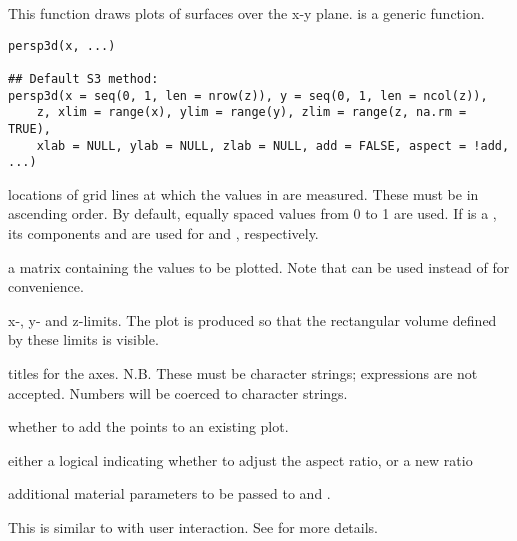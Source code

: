 \documentclass{article}
\begin{document}
\begin{Description}\relax
This function draws plots of surfaces over the
x-y plane.  is a generic function.
\end{Description}
\begin{Usage}
\begin{verbatim}
persp3d(x, ...)

## Default S3 method:
persp3d(x = seq(0, 1, len = nrow(z)), y = seq(0, 1, len = ncol(z)),
    z, xlim = range(x), ylim = range(y), zlim = range(z, na.rm = TRUE),
    xlab = NULL, ylab = NULL, zlab = NULL, add = FALSE, aspect = !add, ...)
\end{verbatim}
\end{Usage}
\begin{Arguments}
\begin{ldescription}
\item[\code{x, y}] locations of grid lines at which the values in  are
measured.  These must be in ascending order.  By default, equally
spaced values from 0 to 1 are used.  If  is a ,
its components  and  are used for 
and , respectively.
\item[\code{z}] a matrix containing the values to be plotted.  
Note that  can be used instead of  for
convenience.
\item[\code{xlim, ylim, zlim}] x-, y-  and z-limits.  The plot is produced
so that the rectangular volume defined by these limits is visible.
\item[\code{xlab, ylab, zlab}] titles for the axes.  N.B. These must be
character strings; expressions are not accepted.  Numbers will be
coerced to character strings.
\item[\code{add}] whether to add the points to an existing plot.
\item[\code{aspect}] either a logical indicating whether to adjust the aspect ratio, or a new ratio
\item[\code{...}] additional material parameters to be passed to 
and .
\end{ldescription}
\end{Arguments}
\begin{Details}\relax
This is similar to  with user interaction.  See 
for more details.
\end{Details}
\end{document}
